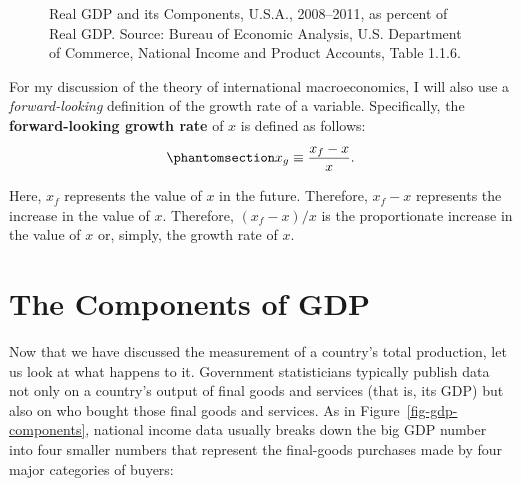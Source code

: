 \documentclass[
  letterpaper,
]{book}
\begin{document}
\begin{figure}


\caption{\label{fig-gdp-components-percent}Real GDP and its Components,
U.S.A., 2008--2011, as percent of Real GDP. Source: Bureau of Economic
Analysis, U.S. Department of Commerce, National Income and Product
Accounts, Table 1.1.6.}

\end{figure}%

For my discussion of the theory of international macroeconomics, I will
also use a \emph{forward-looking} definition of the growth rate of a
variable. Specifically, the \textbf{forward-looking growth rate} of
\(x\) is defined as follows:
\begin{equation}\phantomsection\label{eq-f-growthrate}{
x_g\equiv\frac{x_f-x}{x}.
}\end{equation}

Here, \(x_f\) represents the value of \(x\) in the future. Therefore,
\(x_f-x\) represents the increase in the value of \(x\). Therefore,
\((x_f-x)/x\) is the proportionate increase in the value of \(x\) or,
simply, the growth rate of \(x\).

\section{The Components of GDP}\label{sec-gdp-components}

Now that we have discussed the measurement of a country's total
production, let us look at what happens to it. Government statisticians
typically publish data not only on a country's output of final goods and
services (that is, its GDP) but also on who bought those final goods and
services. As in Figure~\ref{fig-gdp-components}, national income data
usually breaks down the big GDP number into four smaller numbers that
represent the final-goods purchases made by four major categories of
buyers:
\end{document}
